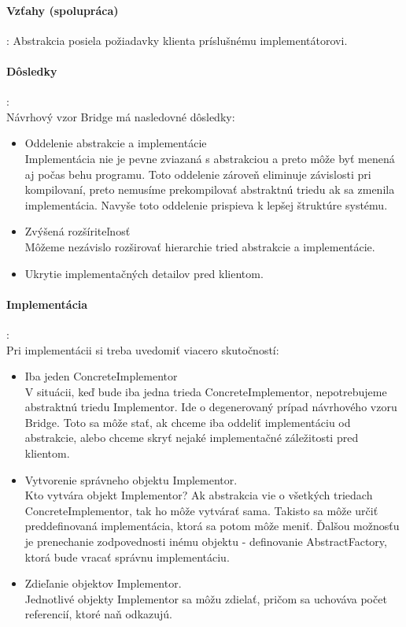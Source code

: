 	\paragraph{Vzťahy (spolupráca)}:
	Abstrakcia posiela požiadavky klienta príslušnému implementátorovi.

	\paragraph{Dôsledky}:\\
		Návrhový vzor Bridge má nasledovné dôsledky:
		\begin{itemize}
			\item Oddelenie abstrakcie a implementácie\\
			Implementácia nie je pevne zviazaná s abstrakciou a preto môže byť menená aj počas behu programu. Toto oddelenie zároveň eliminuje závislosti pri kompilovaní, preto nemusíme prekompilovať abstraktnú triedu ak sa zmenila implementácia. Navyše toto oddelenie prispieva k lepšej štruktúre systému.
			\item Zvýšená rozšíriteľnosť\\
			Môžeme nezávislo rozširovať hierarchie tried abstrakcie a implementácie.
			\item Ukrytie implementačných detailov pred klientom.
		\end{itemize}
	\paragraph{Implementácia}:\\
		Pri implementácii si treba uvedomiť viacero skutočností:
			\begin{itemize}
				\item Iba jeden ConcreteImplementor\\
				V situácii, keď bude iba jedna trieda ConcreteImplementor, nepotrebujeme abstraktnú triedu Implementor. Ide o degenerovaný prípad návrhového vzoru Bridge. Toto sa môže stať, ak chceme iba oddeliť implementáciu od abstrakcie, alebo chceme skryť nejaké implementačné záležitosti pred klientom.
				\item Vytvorenie správneho objektu Implementor.\\
				Kto vytvára objekt Implementor? Ak abstrakcia vie o všetkých triedach ConcreteImplementor, tak ho môže vytvárať sama. Takisto sa môže určiť preddefinovaná implementácia, ktorá sa potom môže meniť. Ďalšou možnosťu je prenechanie zodpovednosti inému objektu - definovanie AbstractFactory, ktorá bude vracať správnu implementáciu.
				\item Zdieľanie objektov Implementor.\\
				Jednotlivé objekty Implementor sa môžu zdielať, pričom sa uchováva počet referencií, ktoré naň odkazujú.
			\end{itemize}
